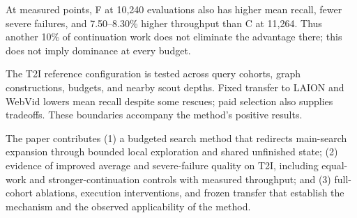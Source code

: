 At measured points, F at 10,240 evaluations also has higher mean recall, fewer severe failures, and 7.50--8.30\% higher throughput than C at 11,264. Thus another 10\% of continuation work does not eliminate the advantage there; this does not imply dominance at every budget.

The T2I reference configuration is tested across query cohorts, graph constructions, budgets, and nearby scout depths. Fixed transfer to LAION and WebVid lowers mean recall despite some rescues; paid selection also supplies tradeoffs. These boundaries accompany the method's positive results.

The paper contributes (1) a budgeted search method that redirects main-search expansion through bounded local exploration and shared unfinished state; (2) evidence of improved average and severe-failure quality on T2I, including equal-work and stronger-continuation controls with measured throughput; and (3) full-cohort ablations, execution interventions, and frozen transfer that establish the mechanism and the observed applicability of the method.
